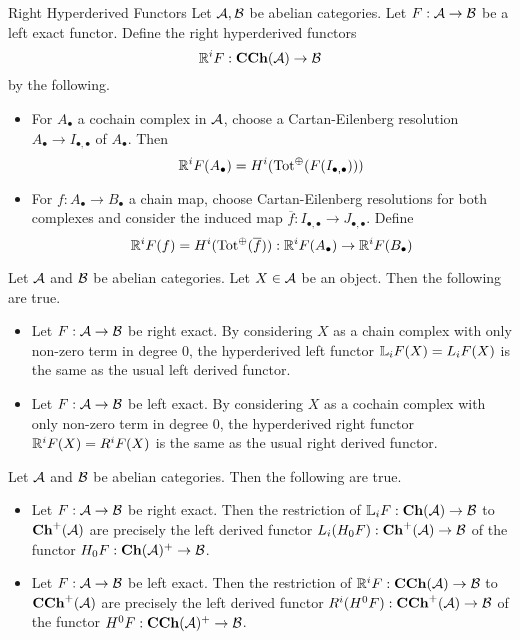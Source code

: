 \documentclass[a4paper]{article}
\begin{document}
\begin{defn}{Right Hyperderived Functors}{} Let $\mathcal{A},\mathcal{B}$ be abelian categories. Let $F:\mathcal{A}\to\mathcal{B}$ be a left exact functor. Define the right hyperderived functors $$\mathbb{R}^i F:\bold{CCh}(\mathcal{A})\to\mathcal{B}$$ by the following. 
\begin{itemize}
\item For $A_\bullet$ a cochain complex in $\mathcal{A}$, choose a Cartan-Eilenberg resolution $A_\bullet\to I_{\bullet,\bullet}$ of $A_\bullet$. Then $$\mathbb{R}^i F(A_\bullet)=H^i(\text{Tot}^\oplus(F(I_{\bullet,\bullet})))$$
\item For $f:A_\bullet\to B_\bullet$ a chain map, choose Cartan-Eilenberg resolutions for both complexes and consider the induced map $\overline{f}:I_{\bullet,\bullet}\to J_{\bullet,\bullet}$. Define $$\mathbb{R}^i F(f)=H^i(\text{Tot}^\oplus(\overline{f})):\mathbb{R}^iF(A_\bullet)\to\mathbb{R}^iF(B_\bullet)$$
\end{itemize}
\end{defn}

\begin{lmm}{}{} Let $\mathcal{A}$ and $\mathcal{B}$ be abelian categories. Let $X\in\mathcal{A}$ be an object. Then the following are true. 
\begin{itemize}
\item Let $F:\mathcal{A}\to\mathcal{B}$ be right exact. By considering $X$ as a chain complex with only non-zero term in degree $0$, the hyperderived left functor $\mathbb{L}_i F(X)=L_iF(X)$ is the same as the usual left derived functor. 
\item Let $F:\mathcal{A}\to\mathcal{B}$ be left exact. By considering $X$ as a cochain complex with only non-zero term in degree $0$, the hyperderived right functor $\mathbb{R}^iF(X)=R^iF(X)$ is the same as the usual right derived functor. 
\end{itemize}
\end{lmm}

\begin{lmm}{}{} Let $\mathcal{A}$ and $\mathcal{B}$ be abelian categories. Then the following are true. 
\begin{itemize}
\item Let $F:\mathcal{A}\to\mathcal{B}$ be right exact. Then the restriction of $\mathbb{L}_i F:\bold{Ch}(\mathcal{A})\to\mathcal{B}$ to $\bold{Ch}^+(\mathcal{A})$ are precisely the left derived functor $L_i (H_0F):\bold{Ch}^+(\mathcal{A})\to\mathcal{B}$ of the functor $H_0F:\bold{Ch}(\mathcal{A})^+\to\mathcal{B}$. 
\item Let $F:\mathcal{A}\to\mathcal{B}$ be left exact. Then the restriction of $\mathbb{R}^i F:\bold{CCh}(\mathcal{A})\to\mathcal{B}$ to $\bold{CCh}^+(\mathcal{A})$ are precisely the left derived functor $R^i (H^0F):\bold{CCh}^+(\mathcal{A})\to\mathcal{B}$ of the functor $H^0F:\bold{CCh}(\mathcal{A})^+\to\mathcal{B}$. 
\end{itemize}
\end{lmm}
\end{document}
